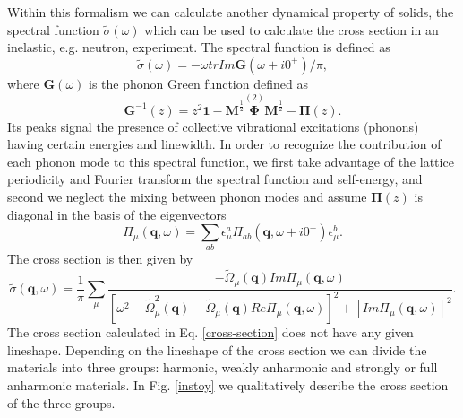 Within this formalism we can calculate another dynamical property of solids, the spectral function $\tilde{\sigma}(\omega)$ which can be used to calculate the cross section in an 
inelastic, e.g. neutron, experiment. The spectral function is defined as\cite{cowley1968anharmonic}
\begin{equation}
 \tilde{\sigma}(\omega)=-\omega trIm\mathbf{G}(\omega+i0^{+})/\pi,
\end{equation}
where $\mathbf{G}(\omega)$ is the phonon Green function defined as
\begin{equation}
 \mathbf{G}^{-1}(z)=z^{2}\boldsymbol{1}-\boldsymbol{M}^{\frac{1}{2}}\overset{(2)}{\boldsymbol{\Phi}}\mathbf{M}^{\frac{1}{2}}-\boldsymbol{\Pi}(z).
\end{equation}
Its peaks signal the presence of collective vibrational excitations (phonons) having certain energies and linewidth. In order to recognize the contribution of each phonon mode to this spectral function, we first take 
advantage of the lattice periodicity and Fourier transform the spectral function and self-energy, and second we neglect the mixing between phonon modes and assume $\boldsymbol{\Pi}(z)$ is diagonal in the basis of 
the eigenvectors
\begin{equation}
 \Pi_{\mu}(\mathbf{q},\omega)=\sum_{ab}\epsilon_{\mu}^{a}\Pi_{ab}(\mathbf{q},\omega+i0^{+})\epsilon_{\mu}^{b}.
\end{equation}
The cross section is then given by
\begin{equation}
 \label{cross-section}
 \tilde{\sigma}(\mathbf{q},\omega)=\frac{1}{\pi}\sum_{\mu}\frac{-\tilde{\Omega}_{\mu}(\mathbf{q}) Im\Pi_{\mu}(\mathbf{q},\omega)}{[\omega^{2}-\tilde{\Omega}_{\mu}^{2}(\mathbf{q})-\tilde{\Omega}_{\mu}(
 \mathbf{q})Re\Pi_{\mu}(\mathbf{q},\omega)]^{2}+[Im\Pi_{\mu}(\mathbf{q},\omega)]^{2}}.
\end{equation}
The cross section calculated in Eq. \ref{cross-section} does not have any given lineshape. Depending on the lineshape of the cross section we can divide the materials into three groups: harmonic, weakly anharmonic and 
strongly or full anharmonic materials. In Fig. \ref{instoy} we qualitatively describe the cross section of the three groups.
